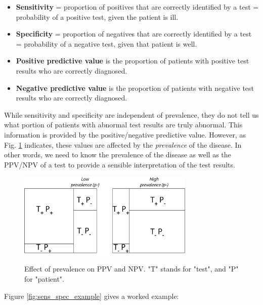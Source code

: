 \begin{itemize}
  \item \textbf{Sensitivity} = proportion of positives that are correctly identified by a test = probability of a positive test, given the patient is ill.
  \item \textbf{Specificity} = proportion of negatives that are correctly identified by a test = probability of a negative test, given that patient is well.
  \item \textbf{Positive predictive value} is the proportion of patients with positive test results who are correctly diagnosed.
  \item \textbf{Negative predictive value} is the proportion of patients with negative test results who are correctly diagnosed.
\end{itemize}

While sensitivity and specificity are independent of prevalence, they do not tell us what portion of patients with abnormal test results are truly abnormal. This information is provided by the positive/negative predictive value. However, as Fig. \ref{fig:prevalence} indicates, these values are affected by the \emph{prevalence}  of the disease. In other words, we need to know the prevalence of the disease as well as the PPV/NPV of a test to provide a sensible interpretation of the test results.

\begin{figure}[ht]
  \centering
  \includegraphics[width=0.75\textwidth]{../Images/Sensitivity_Specificity.png}\\
  \caption{Effect of prevalence on PPV and NPV. "T" stands for "test", and "P" for "patient".} \label{fig:prevalence}
\end{figure}

Figure \ref{fig:sens_spec_example} gives a worked example:

